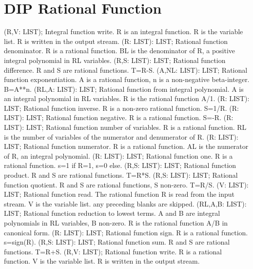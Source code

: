 \section{ DIP Rational Function  } 
 (R,V: LIST); \eproc
\bcom Integral function write. R is an integral function.
R is the variable list. R is written in the output stream.  \ecom 
{} (R: LIST): LIST; \eproc
\bcom Rational function denominator. R is a rational function.
BL is the denominator of R, a positive integral polynomial
in RL variables.  \ecom 
{} (R,S: LIST): LIST; \eproc
\bcom Rational function difference. R and S are rational functions.
T=R-S.  \ecom 
{} (A,NL: LIST): LIST; \eproc
\bcom Rational function exponentiation. A is a rational function,
n is a non-negative beta-integer. B=A**n.  \ecom 
{} (RL,A: LIST): LIST; \eproc
\bcom Rational function from integral polynomial. A is an integral
polynomial in RL variables. R is the rational function A/1.  \ecom 
{} (R: LIST): LIST; \eproc
\bcom Rational function inverse. R is a non-zero rational
function. S=1/R.  \ecom 
{} (R: LIST): LIST; \eproc
\bcom Rational function negative. R is a rational function. S=-R.  \ecom 
{} (R: LIST): LIST; \eproc
\bcom Rational function number of variables. R is a rational
function. RL is the number of variables of the numerator
and denumerator of R.  \ecom 
{} (R: LIST): LIST; \eproc
\bcom Rational function numerator. R is a rational function.
AL is the numerator of R, an integral polynomial.  \ecom 
{} (R: LIST): LIST; \eproc
\bcom Rational function one. R is a rational function. s=1 if R=1,
s=0 else.  \ecom 
{} (R,S: LIST): LIST; \eproc
\bcom Rational function product. R and S are rational functions.
T=R*S.  \ecom 
{} (R,S: LIST): LIST; \eproc
\bcom Rational function quotient. R and S are rational functions,
S non-zero. T=R/S.  \ecom 
{} (V: LIST): LIST; \eproc
\bcom Rational function read. The rational function R is read
from the input stream. V is the variable list. any preceding
blanks are skipped.  \ecom 
{} (RL,A,B: LIST): LIST; \eproc
\bcom Rational function reduction to lowest terms. A and B are
integral polynomials in RL variables, B non-zero. R is the
rational function A/B in canonical form.  \ecom 
{} (R: LIST): LIST; \eproc
\bcom Rational function sign. R is a rational function. s=sign(R).  \ecom 
{} (R,S: LIST): LIST; \eproc
\bcom Rational function sum. R and S are rational functions. T=R+S.  \ecom 
{} (R,V: LIST); \eproc
\bcom Rational function write. R is a rational function. V is the
variable list. R is written in the output stream.  \ecom 
